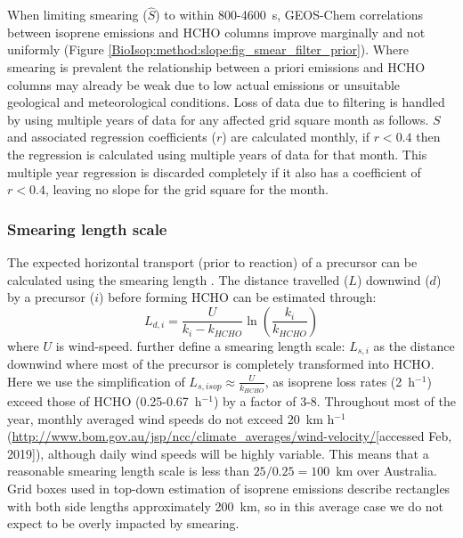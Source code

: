       
      When limiting smearing ($\hat{S}$) to within 800-4600~s, GEOS-Chem correlations between isoprene emissions and HCHO columns improve marginally and not uniformly (Figure \ref{BioIsop:method:slope:fig_smear_filter_prior}). 
      Where smearing is prevalent the relationship between a priori emissions and HCHO columns may already be weak due to low actual emissions or unsuitable geological and meteorological conditions.
      Loss of data due to filtering is handled by using multiple years of data for any affected grid square month as follows.
      $S$ and associated regression coefficients ($r$) are calculated monthly, if $r<0.4$ then the regression is calculated using multiple years of data for that month.
      This multiple year regression is discarded completely if it also has a coefficient of $r<0.4$, leaving no slope for the grid square for the month.
      
    \subsubsection{Smearing length scale}
    
      
      The expected horizontal transport (prior to reaction) of a precursor can be calculated using the smearing length \parencite{Palmer2003}.
      The distance travelled ($L$) downwind ($d$) by a precursor ($i$) before forming HCHO can be estimated through:
      \begin{equation*}
        L_{d,i} = \frac{U}{k_i - k_{HCHO}} \ln{ \left( \frac{k_i}{k_{HCHO}} \right) }
      \end{equation*}
      where $U$ is wind-speed.
      \textcite{Palmer2003} further define a smearing length scale: $L_{s,i}$ as the distance downwind where most of the precursor is completely transformed into HCHO.
      Here we use the simplification of $L_{s,isop} \approx \frac{U}{k_{HCHO}}$, as isoprene loss rates (2~h$^{-1}$) exceed those of HCHO (0.25-0.67~h$^{-1}$) by a factor of 3-8.
      Throughout most of the year, monthly averaged wind speeds do not exceed 20~km h$^{-1}$ (\url{http://www.bom.gov.au/jsp/ncc/climate_averages/wind-velocity/}[accessed Feb, 2019]), although daily wind speeds will be highly variable.
      This means that a reasonable smearing length scale is less than $25 / 0.25 = 100$~km over Australia.
      Grid boxes used in top-down estimation of isoprene emissions describe rectangles with both side lengths approximately 200~km, so in this average case we do not expect to be overly impacted by smearing.
       
